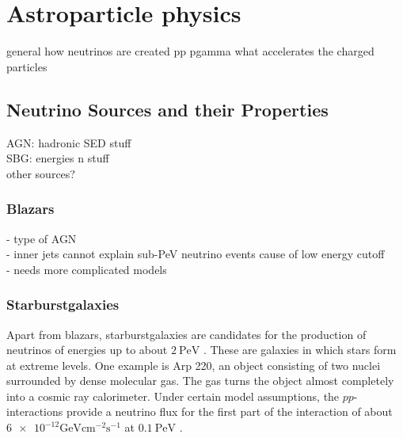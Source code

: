 \chapter{Astroparticle physics} \label{sec:astro}

general how neutrinos are created pp pgamma
what accelerates the charged particles


\section{Neutrino Sources and their Properties}

AGN: hadronic SED stuff\\
SBG: energies n stuff\\
other sources?

\subsection{Blazars}
- type of AGN \\
- inner jets cannot explain sub-PeV neutrino events cause of low energy cutoff \\
- needs more complicated models \\
\cite{blazar}

\subsection{Starburstgalaxies}

Apart from blazars, starburstgalaxies are candidates for the production of neutrinos of energies up to about $\SI{2}{\peta\electronvolt}$ \cite{starburst2}.
These are galaxies in which stars form at extreme levels.
One example is Arp 220, an object consisting of two nuclei surrounded by dense molecular gas.
The gas turns the object almost completely into a cosmic ray calorimeter.
Under certain model assumptions, the $pp$-interactions provide a neutrino flux for the first part of the interaction of about $\num{6e-12}\si{\giga\electronvolt\centi\meter\tothe{-2}\second\tothe{-1}}$ at $\SI{0.1}{\peta\electronvolt}$ \cite{starburst}.

